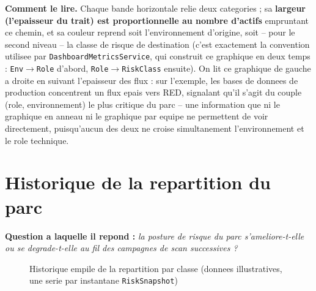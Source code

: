 \textbf{Comment le lire.} Chaque bande horizontale relie deux categories ; sa
\textbf{largeur (l'epaisseur du trait) est proportionnelle au nombre d'actifs}
empruntant ce chemin, et sa couleur reprend soit l'environnement d'origine, soit --
pour le second niveau -- la classe de risque de destination (c'est exactement la
convention utilisee par \texttt{DashboardMetricsService}, qui construit ce graphique
en deux temps : \texttt{Env}$\to$\texttt{Role} d'abord, \texttt{Role}$\to$\texttt{RiskClass}
ensuite). On lit ce graphique de gauche a droite en suivant l'epaisseur des flux : sur
l'exemple, les bases de donnees de production concentrent un flux epais vers RED,
signalant qu'il s'agit du couple (role, environnement) le plus critique du parc --
une information que ni le graphique en anneau ni le graphique par equipe ne
permettent de voir directement, puisqu'aucun des deux ne croise simultanement
l'environnement et le role technique.

\section{Historique de la repartition du parc}

\textbf{Question a laquelle il repond :} \emph{la posture de risque du parc
s'ameliore-t-elle ou se degrade-t-elle au fil des campagnes de scan successives ?}

\begin{figure}[H]
\centering
{}
\caption{Historique empile de la repartition par classe (donnees illustratives, une serie par instantane \texttt{RiskSnapshot})}
\label{fig:chart-history}
\end{figure}

